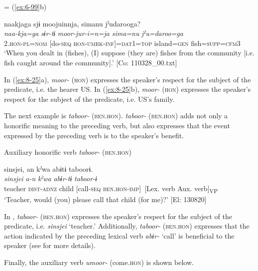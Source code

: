  = (\ref{ex:6-99}b)

{\TM}
\glll  naakjaga  sjɨ  moojuinnja,  simanu jˀudarooga?\\
\textit{naa-kja=ga}  \textit{sɨr-tɨ}  \textit{moor-jur-i=n=ja  sima=nu} \textit{jˀu=daroo=ga}\\
2.\textsc{hon}-\textsc{pl}=\textsc{nom}  [do-\textsc{seq}  \textsc{hon}-\textsc{umrk}-\textsc{inf}]=\textsc{dat1}=\textsc{top}  island=\textsc{gen} fish=\textsc{supp}=\textsc{cfm3}\\
\glt ‘When you dealt in (fishes), (I) suppose (they are) fishes from the community [i.e. fish caught around the community].’ [Co: 110328\_00.txt]
\z
\z

In (\ref{ex:8-25}a), \textit{moor-} (\textsc{hon}) expresses the speaker’s respect for the subject of the predicate, i.e. the hearer US. In (\ref{ex:8-25}b), \textit{moor-} (\textsc{hon}) expresses the speaker’s respect for the subject of the predicate, i.e. US’s family.

  The next example is \textit{taboor-} (\textsc{ben}.\textsc{hon}). \textit{taboor-} (\textsc{ben}.\textsc{hon}) adds not only a honorific meaning to the preceding verb, but also expresses that the event expressed by the preceding verb is to the speaker’s benefit.

\ea\label{ex:8-26}
  Auxiliary honorific verb \textit{taboor-} (\textsc{ben}.\textsc{hon})

  {\TM}
\glll  {\textbar}sinsjei{\textbar},  an  kˀwa  abɨtɨ  taboorɨ.\\
\textit{sinsjei}  \textit{a-n}  \textit{kˀwa}  \textit{abɨr-tɨ}  \textit{taboor-ɨ}\\
teacher  \textsc{dist}-\textsc{adnz}  child  [call-\textsc{seq}  \textsc{ben}.\textsc{hon}-\textsc{imp}]\
          {}[Lex. verb  Aux. verb]\textsubscript{VP}\\
\glt ‘Teacher, would (you) please call that child (for me)?’ [El: 130820]
\z

In , \textit{taboor-} (\textsc{ben}.\textsc{hon}) expresses the speaker’s respect for the subject of the predicate, i.e. \textit{sinsjei} ‘teacher.’ Additionally, \textit{taboor-} (\textsc{ben}.\textsc{hon}) expresses that the action indicated by the preceding lexical verb \textit{abɨr-} ‘call’ is beneficial to the speaker (see  for more details).

  Finally, the auxiliary verb \textit{umoor-} (come.\textsc{hon}) is shown below.

